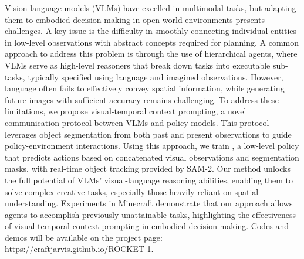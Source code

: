 Vision-language models (VLMs) have excelled in multimodal tasks, but adapting them to embodied decision-making in open-world environments presents challenges. A key issue is the difficulty in smoothly connecting individual entities in low-level observations with abstract concepts required for planning. A common approach to address this problem is through the use of hierarchical agents, where VLMs serve as high-level reasoners that break down tasks into executable sub-tasks, typically specified using language and imagined observations. However, language often fails to effectively convey spatial information, while generating future images with sufficient accuracy remains challenging. To address these limitations, we propose visual-temporal context prompting, a novel communication protocol between VLMs and policy models. This protocol leverages object segmentation from both past and present observations to guide policy-environment interactions. Using this approach, we train \agent, a low-level policy that predicts actions based on concatenated visual observations and segmentation masks, with real-time object tracking provided by SAM-2. Our method unlocks the full potential of VLMs’ visual-language reasoning abilities, enabling them to solve complex creative tasks, especially those heavily reliant on spatial understanding. Experiments in Minecraft demonstrate that our approach allows agents to accomplish previously unattainable tasks, highlighting the effectiveness of visual-temporal context prompting in embodied decision-making. Codes and demos will be available on the project page: \href{https://craftjarvis.github.io/ROCKET-1}{https://craftjarvis.github.io/ROCKET-1}. 